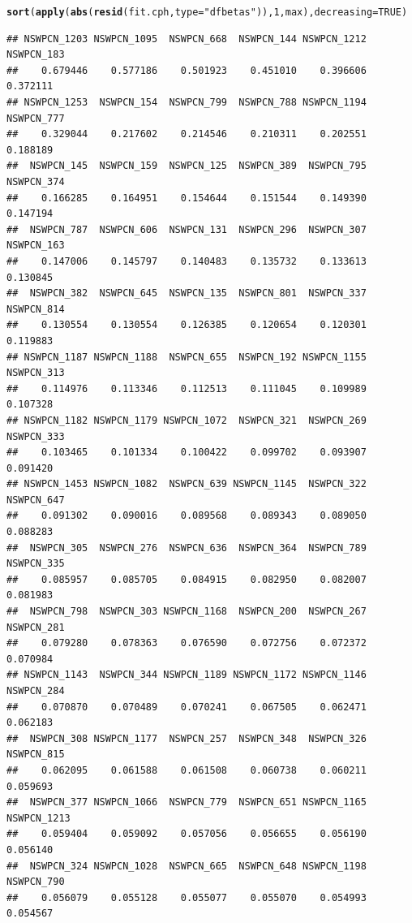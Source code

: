 \documentclass{article}\usepackage[]{graphicx}\usepackage[]{color}
\makeatletter
\newcommand{\hlnum}[1]{\textcolor[rgb]{0.686,0.059,0.569}{#1}}%
\newcommand{\hlstr}[1]{\textcolor[rgb]{0.192,0.494,0.8}{#1}}%
\newcommand{\hlstd}[1]{\textcolor[rgb]{0.345,0.345,0.345}{#1}}%
\newcommand{\hlkwc}[1]{\textcolor[rgb]{0.333,0.667,0.333}{#1}}%
\newcommand{\hlkwd}[1]{\textcolor[rgb]{0.737,0.353,0.396}{\textbf{#1}}}%
\newenvironment{kframe}{%
 \def\at@end@of@kframe{}%
 \ifinner\ifhmode%
  \def\at@end@of@kframe{\end{minipage}}%
  \begin{minipage}{\columnwidth}%
 \fi\fi%
 \def\FrameCommand##1{\hskip\@totalleftmargin \hskip-\fboxsep
 \colorbox{shadecolor}{##1}\hskip-\fboxsep
     \hskip-\linewidth \hskip-\@totalleftmargin \hskip\columnwidth}%
 \MakeFramed {\advance\hsize-\width
   \@totalleftmargin\z@ \linewidth\hsize
   \@setminipage}}%
 {\par\unskip\endMakeFramed%
 \at@end@of@kframe}
\newenvironment{knitrout}{}{} %
\makeatother
\begin{document}
\begin{knitrout}
{}


\begin{kframe}\begin{alltt}
\hlkwd{sort}\hlstd{(}\hlkwd{apply}\hlstd{(}\hlkwd{abs}\hlstd{(}\hlkwd{resid}\hlstd{(fit.cph,} \hlkwc{type} \hlstd{=} \hlstr{"dfbetas"}\hlstd{)),} \hlnum{1}\hlstd{, max),} \hlkwc{decreasing} \hlstd{=} \hlnum{TRUE}\hlstd{)}
\end{alltt}
\begin{verbatim}
## NSWPCN_1203 NSWPCN_1095  NSWPCN_668  NSWPCN_144 NSWPCN_1212  NSWPCN_183 
##    0.679446    0.577186    0.501923    0.451010    0.396606    0.372111 
## NSWPCN_1253  NSWPCN_154  NSWPCN_799  NSWPCN_788 NSWPCN_1194  NSWPCN_777 
##    0.329044    0.217602    0.214546    0.210311    0.202551    0.188189 
##  NSWPCN_145  NSWPCN_159  NSWPCN_125  NSWPCN_389  NSWPCN_795  NSWPCN_374 
##    0.166285    0.164951    0.154644    0.151544    0.149390    0.147194 
##  NSWPCN_787  NSWPCN_606  NSWPCN_131  NSWPCN_296  NSWPCN_307  NSWPCN_163 
##    0.147006    0.145797    0.140483    0.135732    0.133613    0.130845 
##  NSWPCN_382  NSWPCN_645  NSWPCN_135  NSWPCN_801  NSWPCN_337  NSWPCN_814 
##    0.130554    0.130554    0.126385    0.120654    0.120301    0.119883 
## NSWPCN_1187 NSWPCN_1188  NSWPCN_655  NSWPCN_192 NSWPCN_1155  NSWPCN_313 
##    0.114976    0.113346    0.112513    0.111045    0.109989    0.107328 
## NSWPCN_1182 NSWPCN_1179 NSWPCN_1072  NSWPCN_321  NSWPCN_269  NSWPCN_333 
##    0.103465    0.101334    0.100422    0.099702    0.093907    0.091420 
## NSWPCN_1453 NSWPCN_1082  NSWPCN_639 NSWPCN_1145  NSWPCN_322  NSWPCN_647 
##    0.091302    0.090016    0.089568    0.089343    0.089050    0.088283 
##  NSWPCN_305  NSWPCN_276  NSWPCN_636  NSWPCN_364  NSWPCN_789  NSWPCN_335 
##    0.085957    0.085705    0.084915    0.082950    0.082007    0.081983 
##  NSWPCN_798  NSWPCN_303 NSWPCN_1168  NSWPCN_200  NSWPCN_267  NSWPCN_281 
##    0.079280    0.078363    0.076590    0.072756    0.072372    0.070984 
## NSWPCN_1143  NSWPCN_344 NSWPCN_1189 NSWPCN_1172 NSWPCN_1146  NSWPCN_284 
##    0.070870    0.070489    0.070241    0.067505    0.062471    0.062183 
##  NSWPCN_308 NSWPCN_1177  NSWPCN_257  NSWPCN_348  NSWPCN_326  NSWPCN_815 
##    0.062095    0.061588    0.061508    0.060738    0.060211    0.059693 
##  NSWPCN_377 NSWPCN_1066  NSWPCN_779  NSWPCN_651 NSWPCN_1165 NSWPCN_1213 
##    0.059404    0.059092    0.057056    0.056655    0.056190    0.056140 
##  NSWPCN_324 NSWPCN_1028  NSWPCN_665  NSWPCN_648 NSWPCN_1198  NSWPCN_790 
##    0.056079    0.055128    0.055077    0.055070    0.054993    0.054567 

\end{verbatim}
\end{kframe}
\end{knitrout}
\end{document}
